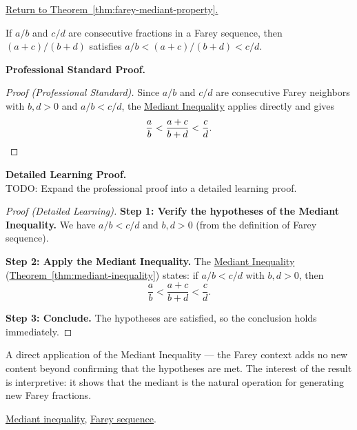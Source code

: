 
\newpage
{}
\label{prf:farey-mediant-property}

\begin{remark*}[Return]
\hyperref[thm:farey-mediant-property]{Return to Theorem~\ref*{thm:farey-mediant-property}.}
\end{remark*}

\begin{theorem*}
If $a/b$ and $c/d$ are consecutive fractions in a Farey sequence, then
$(a+c)/(b+d)$ satisfies $a/b < (a+c)/(b+d) < c/d$.
\end{theorem*}

\textbf{Professional Standard Proof.}~\\
\begin{proof}
[Proof (Professional Standard)]
Since $a/b$ and $c/d$ are consecutive Farey neighbors with $b,d > 0$ and
$a/b < c/d$, the \hyperref[thm:mediant-inequality]{Mediant Inequality}
applies directly and gives
\[
\frac{a}{b} < \frac{a+c}{b+d} < \frac{c}{d}.
\qedhere
\]
\end{proof}

\textbf{Detailed Learning Proof.}~\\
TODO: Expand the professional proof into a detailed learning proof.


\begin{proof}[Proof (Detailed Learning)]
\textbf{Step 1: Verify the hypotheses of the Mediant Inequality.}
We have $a/b < c/d$ and $b, d > 0$ (from the definition of Farey sequence).

\textbf{Step 2: Apply the Mediant Inequality.}
The \hyperref[thm:mediant-inequality]{Mediant Inequality}
(\hyperref[thm:mediant-inequality]{Theorem~\ref*{thm:mediant-inequality}})
states: if $a/b < c/d$ with $b,d > 0$, then
\[
\frac{a}{b} < \frac{a+c}{b+d} < \frac{c}{d}.
\]

\textbf{Step 3: Conclude.}
The hypotheses are satisfied, so the conclusion holds immediately.
\end{proof}

\begin{remark*}
A direct application of the Mediant Inequality — the Farey context adds
no new content beyond confirming that the hypotheses are met.  The
interest of the result is interpretive: it shows that the mediant is
the natural operation for generating new Farey fractions.
\end{remark*}

\begin{dependencies}
\hyperref[thm:mediant-inequality]{Mediant inequality},
\hyperref[def:farey-sequence]{Farey sequence}.
\end{dependencies}
